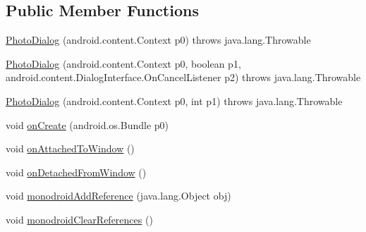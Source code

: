 \subsection*{Public Member Functions}
\begin{DoxyCompactItemize}
\item 
\hyperlink{classfieldservice_1_1android_1_1dialogs_1_1_photo_dialog_aee4c73bcb3e49791f44300b81e7d404d}{Photo\+Dialog} (android.\+content.\+Context p0)  throws java.\+lang.\+Throwable 	
\item 
\hyperlink{classfieldservice_1_1android_1_1dialogs_1_1_photo_dialog_aff0ea722a4f6556588e08021c9c246ea}{Photo\+Dialog} (android.\+content.\+Context p0, boolean p1, android.\+content.\+Dialog\+Interface.\+On\+Cancel\+Listener p2)  throws java.\+lang.\+Throwable 	
\item 
\hyperlink{classfieldservice_1_1android_1_1dialogs_1_1_photo_dialog_afc4e249c0a0fe8aee0ad719f5d361ed2}{Photo\+Dialog} (android.\+content.\+Context p0, int p1)  throws java.\+lang.\+Throwable 	
\item 
void \hyperlink{classfieldservice_1_1android_1_1dialogs_1_1_photo_dialog_a5ff600f8fd93cb25e0c3a03f4be77ce7}{on\+Create} (android.\+os.\+Bundle p0)
\item 
void \hyperlink{classfieldservice_1_1android_1_1dialogs_1_1_photo_dialog_aa4117421de0e6e37bd481ff43c9c5810}{on\+Attached\+To\+Window} ()
\item 
void \hyperlink{classfieldservice_1_1android_1_1dialogs_1_1_photo_dialog_a09d7ffd6a3d8184fb8640e83531a3521}{on\+Detached\+From\+Window} ()
\item 
void \hyperlink{classfieldservice_1_1android_1_1dialogs_1_1_photo_dialog_a589ba07f67ad8c41ef31fb894d8cbe2d}{monodroid\+Add\+Reference} (java.\+lang.\+Object obj)
\item 
void \hyperlink{classfieldservice_1_1android_1_1dialogs_1_1_photo_dialog_aff4d57416d19906cecd64f364dddb6f4}{monodroid\+Clear\+References} ()
\end{DoxyCompactItemize}


